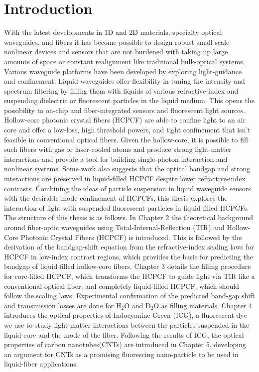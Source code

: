 \chapter{Introduction}
With the latest developments in 1D and 2D materials, specialty optical waveguides, and fibers it has become possible to design robust small-scale nonlinear devices and sensors\cite{cusano,yamashita.tutorial} that are not burdened with taking up large amounts of space or constant realignment like traditional bulk-optical systems.
Various waveguide platforms have been developed by exploring light-guidance and confinement.
Liquid waveguides offer flexibility in tuning the intensity and spectrum filtering by filling them with liquids of various refractive-index and suspending dielectric or fluorescent particles in the liquid medium\cite{conroy, bliss, vezenov}.
This opens the possibility to on-chip and fiber-integrated sensors and fluorescent light sources.
Hollow-core photonic crystal fibers (HCPCF) are able to confine light to an air core and offer a low-loss, high threshold powers, and tight confinement that isn't feasible in conventional optical fibers.
Given the hollow-core, it is possible to fill such fibers with gas or laser-cooled atoms and produce strong light-matter interactions\cite{bajcsy, hilton} and provide a tool for building single-photon interaction and nonlinear systems.
Some work also suggests that the optical bandgap and strong interactions are preserved in liquid-filled HCPCF \cite{antonopoulos} despite lower refractive-index contrasts.
Combining the ideas of particle suspension in liquid waveguide sensors with the desirable mode-confinement of HCPCFs, this thesis explores the interaction of light with suspended fluorescent particles in liquid-filled HCPCFs.\\ 

The structure of this thesis is as follows. In Chapter 2 the theoretical background around fiber-optic waveguides using Total-Internal-Reflection (TIR) and Hollow-Core Photonic Crystal Fibers (HCPCF) is introduced. This is followed by the derivation of the bandgap-shift equation from the refractive-index scaling laws for HCPCF in low-index contrast regions, which provides the basis for predicting the bandgap of liquid-filled hollow-core fibers.
Chapter 3 details the filling procedure for core-filled HCPCF, which transforms the HCPCF to guide light via TIR like a conventional optical fiber, and completely liquid-filled HCPCF, which should follow the scaling laws. Experimental confirmation of the predicted band-gap shift and transmission losses are done for H${}_2$O and D${}_2$O as filling materials. Chapter 4 introduces the optical properties of Indocyanine Green (ICG), a fluorescent dye we use to study light-matter interactions between the particles suspended in the liquid-core and the mode of the fiber. Following the results of ICG, the optical properties of carbon nanotubes(CNTs) are introduced in Chapter 5, developing an argument for CNTs as a promising fluorescing nano-particle to be used in liquid-fiber applications. 